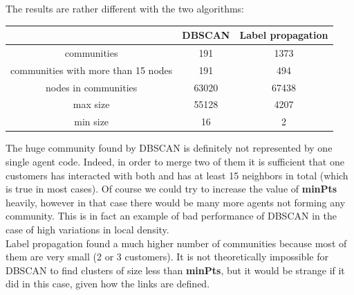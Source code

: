 \documentclass[a4paper,11pt]{book}
\begin{document}
The results are rather different with the two algorithms:
\begin{center}
  \begin{tabular}{||c|c|c||}
\hline
 \phantom{0} & DBSCAN & Label propagation \\ 
\hline
communities & 191 & 1373 \\
\hline
communities with more than 15 nodes & 191 & 494 \\
\hline
nodes in communities & 63020 & 67438 \\
\hline
max size & 55128 & 4207 \\
\hline
min size & 16 & 2 \\
\hline
\end{tabular}
\end{center}
The huge community found by DBSCAN is definitely not represented by one single agent code. Indeed, in order to merge two of them it is sufficient that one customers has interacted with both and has at least 15 neighbors in total (which is true in most cases). Of course we could try to increase the value of \textbf{minPts} heavily, however in that case there would be many more agents not forming any community. This is in fact an example of bad performance of DBSCAN in the case of high variations in local density.\\
Label propagation found a much higher number of communities because most of them are very small (2 or 3 customers). It is not theoretically impossible for DBSCAN to find clusters of size less than \textbf{minPts}, but it would be strange if it did in this case, given how the links are defined.\\
\end{document}
